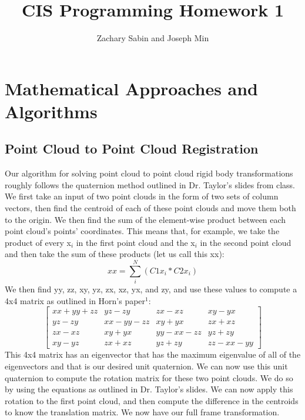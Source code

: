 \documentclass[a4paper]{article}
\title{CIS Programming Homework 1}
\author{Zachary Sabin and Joseph Min}
\begin{document}
\maketitle

\section{Mathematical Approaches and Algorithms}
\subsection{Point Cloud to Point Cloud Registration}
Our algorithm for solving point cloud to point cloud rigid body transformations roughly follows the quaternion method outlined in Dr. Taylor’s slides from class. We first take an input of two point clouds in the form of two sets of column vectors, then find the centroid of each of these point clouds and move them both to the origin. We then find the sum of the element-wise product between each point cloud’s points’ coordinates. This means that, for example, we take the product of every x$_i$ in the first point cloud and the x$_i$ in the second point cloud and then take the sum of these products (let us call this xx):
\[xx = \sum_{i}^{N}(C1x_i*C2x_i)\]
We then find yy, zz, xy, yz, zx, xz, yx, and zy, and use these values to compute a 4x4 matrix as outlined in Horn’s paper$^1$:
\[
\begin{bmatrix}
    xx+yy+zz & yz-zy & zx-xz  & xy-yx \\
    yz-zy & xx-yy-zz & xy+yx & zx+xz \\
    zx-xz & xy+yx & yy-xx-zz & yz+zy \\
    xy-yz & zx+xz & yz+zy & zz-xx-yy
\end{bmatrix}
\]
This 4x4 matrix has an eigenvector that has the maximum eigenvalue of all of the eigenvectors and that is our desired unit quaternion. We can now use this unit quaternion to compute the rotation matrix for these two point clouds. We do so by using the equations as outlined in Dr. Taylor’s slides. We can now apply this rotation to the first point cloud, and then compute the difference in the centroids to know the translation matrix. We now have our full frame transformation.
\end{document}
